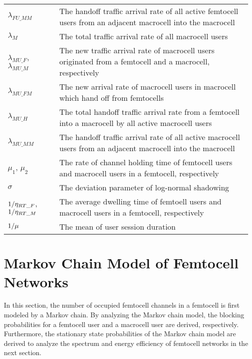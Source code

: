 \documentclass[10pt,final,journal,letterpaper,twoside,twocolumn]{IEEEtran}
\begin{document}
\begin{table*}[htbp]
\begin{tabular}{l|l}
${\lambda_{FU\_MM}}$ & The handoff traffic arrival rate of all active femtocell users from an adjacent macrocell into the macrocell \\
${\lambda _M}$ & The total traffic arrival rate of all macrocell users \\
${\lambda _{MU\_F}}$, ${\lambda _{MU\_M}}$ & The new traffic arrival rate of macrocell users originated from a femtocell and a macrocell, respectively \\
${\lambda_{MU\_FM}}$ & The new arrival rate of macrocell users in macrocell which hand off from femtocells \\
${\lambda_{MU\_H}}$ & The total handoff traffic arrival rate from a femtocell into a macrocell by all active macrocell users \\
${\lambda_{MU\_MM}}$ & The handoff traffic arrival rate of all active macrocell users from an adjacent macrocell into the macrocell \\
${\mu _1}$, ${\mu _2}$ & The rate of channel holding time of femtocell users and macrocell users in a femtocell, respectively \\
$\sigma $ & The deviation parameter of log-normal shadowing \\
${1 \mathord{\left/ {\vphantom {1 {{\eta _{RT\_F}}}}} \right.\kern-\nulldelimiterspace} {{\eta _{RT\_F}}}}$, ${1 \mathord{\left/{\vphantom {1 {{\eta _{RT\_M}}}}} \right. \kern-\nulldelimiterspace} {{\eta_{RT\_M}}}}$ & The average dwelling time of femtoell users and macrocell users in a femtocell, respectively \\
${1 \mathord{\left/{\vphantom {1 \mu }} \right. \kern-\nulldelimiterspace} \mu }$ & The mean of user session duration \\
\hline
\end{tabular}
\end{table*}



\section{Markov Chain Model of Femtocell Networks}
\label{sec3}

In this section, the number of occupied femtocell channels in a femtocell is first modeled by a Markov chain. By analyzing the Markov chain model, the blocking probabilities for a femtocell user and a macrocell user are derived, respectively. Furthermore, the stationary state probabilities of the Markov chain model are derived to analyze the spectrum and energy efficiency of femtocell networks in the next section.
\end{document}
